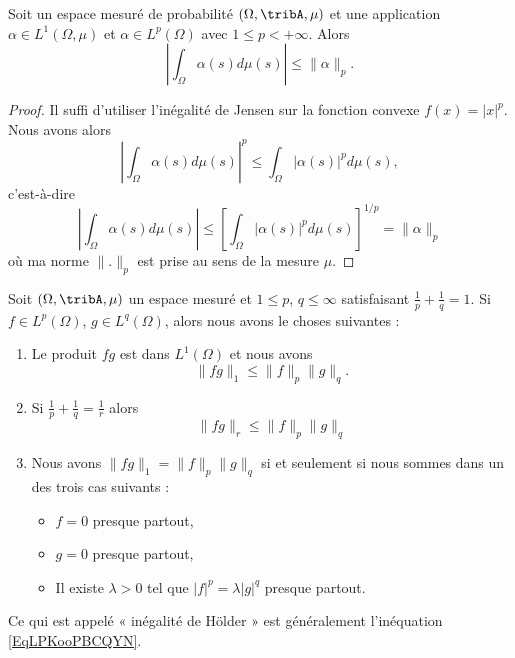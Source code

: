 \begin{corollary}
    Soit un espace mesuré de probabilité \( (\Omega,\tribA,\mu)\) et une application \( \alpha\in L^1(\Omega,\mu)\) et \( \alpha\in L^p(\Omega)\) avec \( 1\leq p<+\infty\). Alors
    \begin{equation}
        | \int_{\Omega}\alpha(s)d\mu(s) |\leq \| \alpha \|_p.
    \end{equation}
\end{corollary}

\begin{proof}
    Il suffi d'utiliser l'inégalité de Jensen sur la fonction convexe \( f(x)=| x |^p\). Nous avons alors
    \begin{equation}
        | \int_{\Omega}\alpha(s)d\mu(s) |^p\leq \int_{\Omega}| \alpha(s) |^pd\mu(s),
    \end{equation}
    c'est-à-dire
    \begin{equation}
        | \int_{\Omega}\alpha(s)d\mu(s) |\leq  \left[  \int_{\Omega}| \alpha(s) |^pd\mu(s)\right]^{1/p}=\| \alpha \|_p
    \end{equation}
    où ma norme \( \| . \|_p\) est prise au sens de la mesure \( \mu\).
\end{proof}

\begin{proposition}       \label{ProptYqspT}
    Soit \(  (\Omega,\tribA,\mu) \) un espace mesuré et \( 1\leq p\), \( q\leq\infty\) satisfaisant \( \frac{1}{ p }+\frac{1}{ q }=1\). Si \( f\in L^p(\Omega)\), \( g\in L^q(\Omega)\), alors nous avons le choses suivantes :

    \begin{enumerate}
        \item       \label{ITEMooNDKPooRKdmgS}
    Le produit \( fg\) est dans \( L^1(\Omega)\) et nous avons
    \begin{equation}    \label{EqLPKooPBCQYN}
        \| fg \|_1\leq \| f \|_p\| g \|_q.
    \end{equation}
\item           \label{ITEMooQHLPooRWWMOP}
    Si \( \frac{1}{ p }+\frac{1}{ q }=\frac{1}{ r }\) alors
    \begin{equation}    \label{EqAVZooFNyzmT}
        \| fg \|_r\leq \| f \|_p\| g \|_q
    \end{equation}
\item       \label{ITEMooBOYJooRkiAqJ}
    Nous avons \( \| fg \|_1=\| f \|_p\| g \|_q\) si et seulement si nous sommes dans un des trois cas suivants :
    \begin{itemize}
        \item \( f=0\) presque partout,
        \item \( g=0\) presque partout,
        \item Il existe \( \lambda> 0\) tel que \( | f |^p=\lambda| g |^q\) presque partout.
    \end{itemize}
    \end{enumerate}
\end{proposition}
Ce qui est appelé « inégalité de Hölder » est généralement l'inéquation \eqref{EqLPKooPBCQYN}.

